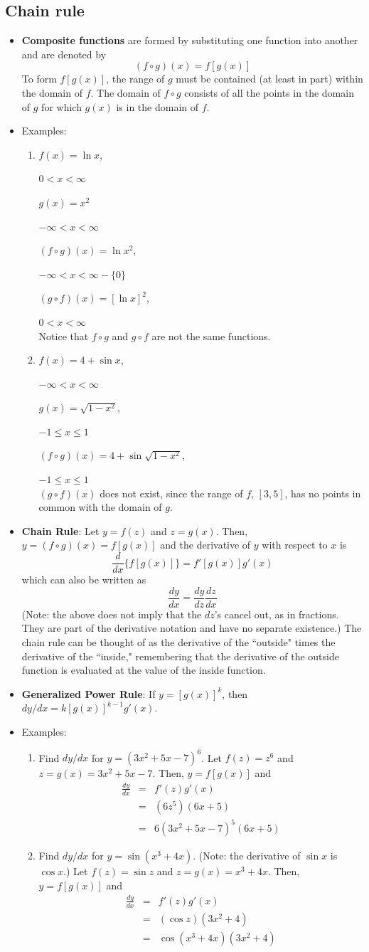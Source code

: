 \documentclass[11pt]{article}
\newcommand{\bi}{\begin{itemize}}
\newcommand{\ei}{\end{itemize}}
\newcommand{\be}{\begin{enumerate}}
\newcommand{\ee}{\end{enumerate}}
\newcommand{\pbt}{\parbox[t]{2in}}
\newcommand{\beqa}{\begin{eqnarray}}
\newcommand{\eeqa}{\end{eqnarray}}
\newcommand{\non}{\nonumber}
\begin{document}
\subsection{Chain rule}
\bi
\item {\bf Composite functions} are formed by substituting one function
into another and are denoted by $$(f\circ g)(x)=f[g(x)]$$  To form
 $f[g(x)]$, the range of $g$ must be contained (at least in part) within
the domain of $f$. The domain of $f\circ g$ consists of all the points
in the domain of $g$ for which $g(x)$ is in the domain of $f$.
\item Examples:
  \be
  \item \pbt{$f(x)=\ln x$,}  $0<x<\infty$\\
  \pbt{$g(x)=x^2$} $-\infty<x<\infty$\\
  \pbt{$(f\circ g)(x)=\ln x^2$,} $-\infty<x<\infty - \{0\}$\\
  \pbt{$(g\circ f)(x)=[\ln x]^2$,} $0<x<\infty$\\
  Notice that $f\circ g$ and $g\circ f$ are not the same functions.
  \item \pbt{$f(x)=4+\sin x$,} $-\infty<x<\infty$\\
  \pbt{$g(x)=\sqrt{1-x^2}$,} $-1\le x\le 1$\\
  \pbt{$(f\circ g)(x)=4+\sin \sqrt{1-x^2}$,} $-1\le x\le 1$\\
  $(g\circ f)(x)$ does not exist, since the range of $f$, $[3,5]$, has no
points in common with the domain of $g$.
  \ee

\item {\bf Chain Rule}:  Let $y=f(z)$ and $z=g(x)$.  Then, $y=(f\circ
g)(x)=f[g(x)]$ and the derivative of $y$ with respect to $x$ is
$$\frac{d}{dx} \{ f[g(x)] \} = f'[g(x)] g'(x)$$ which can also be
written as $$\frac{dy}{dx}=\frac{dy}{dz} \frac{dz}{dx}$$ (Note: the
above does not imply that the $dz$'s cancel out, as in fractions.  They
are part of the derivative notation and have no separate existence.)
The chain rule can be thought of as the derivative of the ``outside"
times the derivative of the ``inside," remembering that the derivative
of the outside function is evaluated at the value of the inside
function.

\item {\bf Generalized Power Rule}:  If $y=[g(x)]^k$, then
$dy/dx=k[g(x)]^{k-1}g'(x)$.

\item Examples:
  \be
  \item Find $dy/dx$ for $y=(3x^2+5x-7)^6$.
Let $f(z)=z^6$ and $z=g(x)=3x^2+5x-7$.  Then, $y=f[g(x)]$ and
\beqa
\frac{dy}{dx}&=& f'(z) g'(x)\non\\
             &=& \left(6z^5\right) (6x+5)\non\\
             &=& 6\left(3x^2+5x-7\right)^5 (6x+5)\non
\eeqa
  \item Find $dy/dx$ for $y=\sin(x^3+4x)$.
(Note: the derivative of $\sin x$ is $\cos x$.)  Let $f(z)=\sin z$ and
$z=g(x)=x^3+4x$.  Then, $y=f[g(x)]$ and
\beqa
\frac{dy}{dx}&=& f'(z) g'(x)\non\\
             &=& \left(\cos z\right) (3x^2+4)\non\\
             &=& \cos\left(x^3+4x\right) \left(3x^2+4\right)\non
\eeqa
  \ee
\ei
\end{document}
